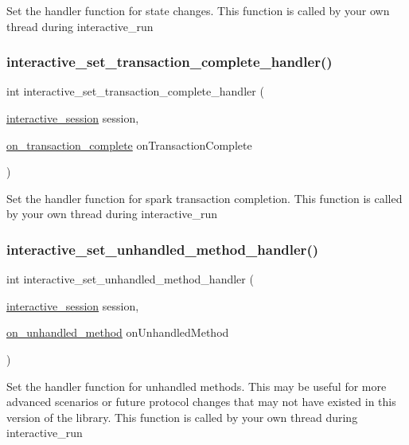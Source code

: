 Set the handler function for state changes. This function is called by your own thread during {\ttfamily interactive\+\_\+run} 

\mbox{\label{group___interactivity_ga3db94cd0c6b594bdacaa90d1a8f1175d}} 
\subsubsection{\texorpdfstring{interactive\+\_\+set\+\_\+transaction\+\_\+complete\+\_\+handler()}{interactive\_set\_transaction\_complete\_handler()}}
{\footnotesize\ttfamily int interactive\+\_\+set\+\_\+transaction\+\_\+complete\+\_\+handler (\begin{DoxyParamCaption}\item[{\mbox{\hyperlink{group___interactivity_ga6d8819d38b8dc8994a2299cf22a65a31}{interactive\+\_\+session}}}]{session,  }\item[{\mbox{\hyperlink{group___interactivity_gadd027ab4911a031b88ecd8603ed7cbd3}{on\+\_\+transaction\+\_\+complete}}}]{on\+Transaction\+Complete }\end{DoxyParamCaption})}



Set the handler function for spark transaction completion. This function is called by your own thread during {\ttfamily interactive\+\_\+run} 

\mbox{\label{group___interactivity_ga64a2774cdc221930f838bde73190ef52}} 
\subsubsection{\texorpdfstring{interactive\+\_\+set\+\_\+unhandled\+\_\+method\+\_\+handler()}{interactive\_set\_unhandled\_method\_handler()}}
{\footnotesize\ttfamily int interactive\+\_\+set\+\_\+unhandled\+\_\+method\+\_\+handler (\begin{DoxyParamCaption}\item[{\mbox{\hyperlink{group___interactivity_ga6d8819d38b8dc8994a2299cf22a65a31}{interactive\+\_\+session}}}]{session,  }\item[{\mbox{\hyperlink{group___interactivity_ga1f1661f615bd28112daad64f95103a6a}{on\+\_\+unhandled\+\_\+method}}}]{on\+Unhandled\+Method }\end{DoxyParamCaption})}



Set the handler function for unhandled methods. This may be useful for more advanced scenarios or future protocol changes that may not have existed in this version of the library. This function is called by your own thread during {\ttfamily interactive\+\_\+run} 

